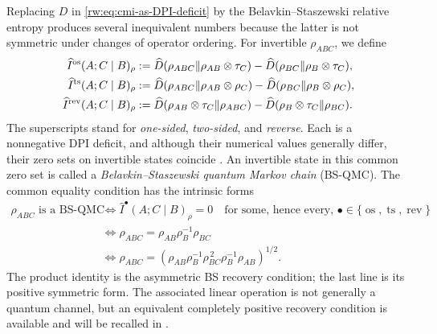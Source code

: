 \documentclass[11pt]{article}
\theoremstyle{remark}
\DeclareMathOperator{\os}{os}
\DeclareMathOperator{\ts}{ts}
\DeclareMathOperator{\rev}{rev}
\newcommand{\1}{\mathbbm{1}}
\begin{document}
Replacing $D$ in \eqref{rw:eq:cmi-as-DPI-deficit} by the
Belavkin--Staszewski relative entropy produces several inequivalent
numbers because the latter is not symmetric under changes of
operator ordering.  For invertible $\rho_{ABC}$, we define
\begin{align}
 \widehat I^{\os}(A;C\mid B)_\rho
 &:=
 \widehat D(\rho_{ABC}\Vert\rho_{AB}\otimes\tau_C)
 -\widehat D(\rho_{BC}\Vert\rho_B\otimes\tau_C),\notag\\
 \widehat I^{\ts}(A;C\mid B)_\rho
 &:=
 \widehat D(\rho_{ABC}\Vert\rho_{AB}\otimes\rho_C)
 -\widehat D(\rho_{BC}\Vert\rho_B\otimes\rho_C),\notag\\
 \widehat I^{\rev}(A;C\mid B)_\rho
 &:=
 \widehat D(\rho_{AB}\otimes\tau_C\Vert\rho_{ABC})
 -\widehat D(\rho_B\otimes\tau_C\Vert\rho_{BC}).
 \label{rw:eq:three-BS-CMIs}
\end{align}
The superscripts stand for \emph{one-sided}, \emph{two-sided}, and
\emph{reverse}.  Each is a nonnegative DPI deficit, and although
their numerical values generally differ, their zero sets on invertible states
coincide
\cite{bluhm2023continuity,alhambra2026conditional,Bluhm:2025kai}.
An invertible state in this common zero set is called a
\emph{Belavkin--Staszewski quantum Markov chain} (BS-QMC).  The common
equality condition has the intrinsic forms
\begin{equation}
 \begin{aligned}
 \rho_{ABC}\text{ is a BS-QMC}
 &\Longleftrightarrow
 \widehat I^\bullet(A;C\mid B)_\rho=0
 \quad\text{for some, hence every, }
 \bullet\in\{\os,\ts,\rev\}\\
 &\Longleftrightarrow
 \rho_{ABC}=\rho_{AB}\rho_B^{-1}\rho_{BC}\\
 &\Longleftrightarrow
 \rho_{ABC}
 =\left(\rho_{AB}\rho_B^{-1}\rho_{BC}^{\,2}
        \rho_B^{-1}\rho_{AB}\right)^{1/2}.
 \end{aligned}
 \label{rw:eq:bsqmc-equivalent-conditions}
\end{equation}
The product identity is the asymmetric BS recovery condition; the
last line is its positive symmetric form.  The associated linear
operation is not generally a quantum channel, but an equivalent
completely positive recovery condition is available and will be
recalled in .
\end{document}
